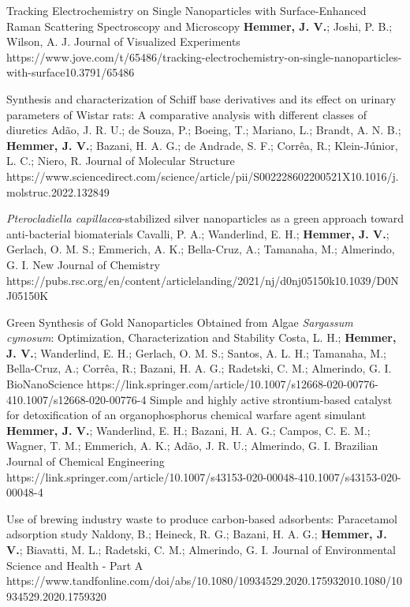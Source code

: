 \documentclass[10pt, twoside, table]{article} %
\begin{document}
\publication
	{Tracking Electrochemistry on Single Nanoparticles with Surface-Enhanced Raman Scattering Spectroscopy and Microscopy}
	{\textbf{Hemmer, J. V.}; Joshi, P. B.; Wilson, A. J.}
	{Journal of Visualized Experiments}
	{https://www.jove.com/t/65486/tracking-electrochemistry-on-single-nanoparticles-with-surface}{10.3791/65486}

\publication
	{Synthesis and characterization of Schiff base derivatives and its effect on urinary parameters of Wistar rats: A comparative analysis with different classes of diuretics}
	{Ad\~ao, J. R. U.; de Souza, P.; Boeing, T.; Mariano, L.; Brandt, A. N. B.; \textbf{Hemmer, J. V.}; Bazani, H. A. G.; de Andrade, S. F.; Corr\^ea, R.; Klein-J\'unior, L. C.; Niero, R.}
	{Journal of Molecular Structure}
	{https://www.sciencedirect.com/science/article/pii/S002228602200521X}{10.1016/j.molstruc.2022.132849}

\publication
	{\textit{Pterocladiella capillacea}-stabilized silver nanoparticles as a green approach toward anti-bacterial biomaterials}
	{Cavalli, P. A.; Wanderlind, E. H.; \textbf{Hemmer, J. V.}; Gerlach, O. M. S.; Emmerich, A. K.; Bella-Cruz, A.; Tamanaha, M.; Almerindo, G. I.}
	{New Journal of Chemistry}
	{https://pubs.rsc.org/en/content/articlelanding/2021/nj/d0nj05150k}{10.1039/D0NJ05150K}

\publication
	{Green Synthesis of Gold Nanoparticles Obtained from Algae \textit{Sargassum cymosum}: Optimization, Characterization and Stability}
	{Costa, L. H.; \textbf{Hemmer, J. V.}; Wanderlind, E. H.; Gerlach, O. M. S.; Santos, A. L. H.; Tamanaha, M.; Bella-Cruz, A.; Corr\^ea, R.; Bazani, H. A. G.; Radetski, C. M.; Almerindo, G. I.}
	{BioNanoScience}
	{https://link.springer.com/article/10.1007/s12668-020-00776-4}{10.1007/s12668-020-00776-4}
\publication
	{Simple and highly active strontium-based catalyst for detoxification of an organophosphorus chemical warfare agent simulant}
	{\textbf{Hemmer, J. V.}; Wanderlind, E. H.; Bazani, H. A. G.; Campos, C. E. M.; Wagner, T. M.; Emmerich, A. K.; Ad\~ao, J. R. U.; Almerindo, G. I.}
	{Brazilian Journal of Chemical Engineering}
	{https://link.springer.com/article/10.1007/s43153-020-00048-4}{10.1007/s43153-020-00048-4}

\centervdottofooter
\continuednewpage

\publication
	{Use of brewing industry waste to produce carbon-based adsorbents: Paracetamol adsorption study}
	{Naldony, B.; Heineck, R. G.; Bazani, H. A. G.; \textbf{Hemmer, J. V.}; Biavatti, M. L.; Radetski, C. M.; Almerindo, G. I.}
	{Journal of Environmental Science and Health - Part A}
	{https://www.tandfonline.com/doi/abs/10.1080/10934529.2020.1759320}{10.1080/10934529.2020.1759320}
\end{document}
